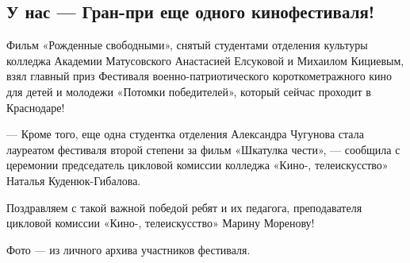  
 
 
 
 
\subsection{У нас — Гран-при еще одного кинофестиваля!}
\label{sec:11_12_2021.stz.edu.lnr.lgaki.1.granpri}


Фильм «Рожденные свободными», снятый студентами отделения культуры колледжа
Академии Матусовского Анастасией Елсуковой и Михаилом Кициевым, взял главный
приз Фестиваля военно-патриотического короткометражного кино для детей и
молодежи «Потомки победителей», который сейчас проходит в Краснодаре!


— Кроме того, еще одна студентка отделения Александра Чугунова стала лауреатом
фестиваля второй степени за фильм «Шкатулка чести», — сообщила с церемонии
председатель цикловой комиссии колледжа «Кино-, телеискусство» Наталья
Куденюк-Гибалова.

Поздравляем с такой важной победой ребят и их педагога, преподавателя цикловой
комиссии «Кино-, телеискусство» Марину Моренову!

Фото — из личного архива участников фестиваля.
